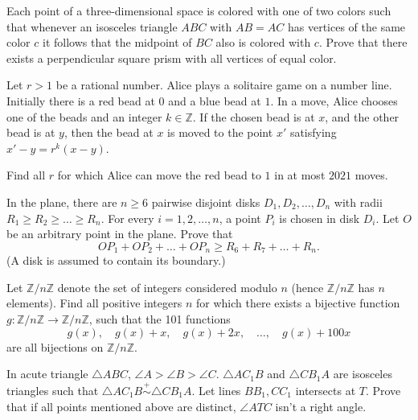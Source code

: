 \documentclass[11pt]{scrartcl}
\begin{document}
\begin{problem}[302701281403387]
  Each point of a three-dimensional space is colored
  with one of two colors such that
  whenever an isosceles triangle $ABC$ with $AB = AC$
  has vertices of the same color $c$ it follows that
  the midpoint of $BC$ also is colored with $c$.
  Prove that there exists a perpendicular square prism
  with all vertices of equal color.
\end{problem}
\begin{problem}[8866273454792491736]
	Let $r>1$ be a rational number. Alice plays a solitaire game on a number line. Initially there is a red bead at $0$ and a blue bead at $1$. In a move, Alice chooses one of the beads and an integer $k \in \mathbb{Z}$. If the chosen bead is at $x$, and the other bead is at $y$, then the bead at $x$ is moved to the point $x'$ satisfying $x'-y=r^k(x-y)$.

Find all $r$ for which Alice can move the red bead to $1$ in at most $2021$ moves.
\end{problem}
\begin{problem}[6654677204410680146]
In the plane, there are $n \geqslant 6$ pairwise disjoint disks $D_{1}, D_{2}, \ldots, D_{n}$ with radii $R_{1} \geqslant R_{2} \geqslant \ldots \geqslant R_{n}$. For every $i=1,2, \ldots, n$, a point $P_{i}$ is chosen in disk $D_{i}$. Let $O$ be an arbitrary point in the plane. Prove that\[O P_{1}+O P_{2}+\ldots+O P_{n} \geqslant R_{6}+R_{7}+\ldots+R_{n}.\](A disk is assumed to contain its boundary.)
\end{problem}
\begin{problem}[1856371892766039579]
Let $\mathbb{Z}/n\mathbb{Z}$ denote the set of integers considered modulo $n$ (hence $\mathbb{Z}/n\mathbb{Z}$ has $n$ elements). Find all positive integers $n$ for which there exists a bijective function $g: \mathbb{Z}/n\mathbb{Z} \to \mathbb{Z}/n\mathbb{Z}$, such that the 101 functions
\[g(x), \quad g(x) + x, \quad g(x) + 2x, \quad \dots, \quad g(x) + 100x\]are all bijections on $\mathbb{Z}/n\mathbb{Z}$.
\end{problem}
\begin{problem}[8534263250311217423]
	In acute triangle $\triangle {ABC}$, $\angle 
A > \angle B > \angle C$. $\triangle {AC_1B}$ and $\triangle {CB_1A}$ are isosceles triangles such that $\triangle {AC_1B} \stackrel{+}{\sim}  \triangle {CB_1A}$. Let lines $BB_1, CC_1$ intersects at ${T}$. Prove that if all points mentioned above are distinct, $\angle ATC$ isn't a right angle.
\end{problem}
\end{document}
